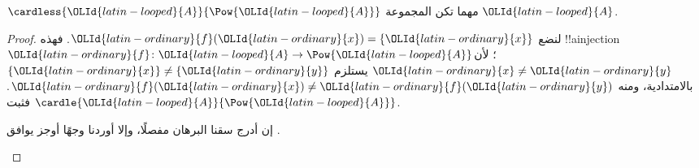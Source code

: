 \documentclass[../../../include/open-logic-section]{subfiles}
\begin{document}
\begin{thm}[كانتور]
$\cardless{\OLId{latin-looped}{A}}{\Pow{\OLId{latin-looped}{A}}}$ مهما تكن المجموعة $\OLId{latin-looped}{A}$.
\end{thm}

\begin{proof}
لنضع $\OLId{latin-ordinary}{f}(\OLId{latin-ordinary}{x}) = \{\OLId{latin-ordinary}{x}\}$. فهذه !!a{injection} $\OLId{latin-ordinary}{f} \colon \OLId{latin-looped}{A} \to \Pow{\OLId{latin-looped}{A}}$؛ لأن $\OLId{latin-ordinary}{x} \neq \OLId{latin-ordinary}{y}$ يستلزم $\{\OLId{latin-ordinary}{x}\} \neq \{\OLId{latin-ordinary}{y}\}$ بالامتدادية، ومنه $\OLId{latin-ordinary}{f}(\OLId{latin-ordinary}{x}) \neq \OLId{latin-ordinary}{f}(\OLId{latin-ordinary}{y})$. فثبت $\cardle{\OLId{latin-looped}{A}}{\Pow{\OLId{latin-looped}{A}}}$.

\begin{editorial}
إن أدرج  سقنا البرهان مفصلًا، وإلا أوردنا وجهًا أوجز يوافق .
\end{editorial}


\end{proof}
\end{document}
